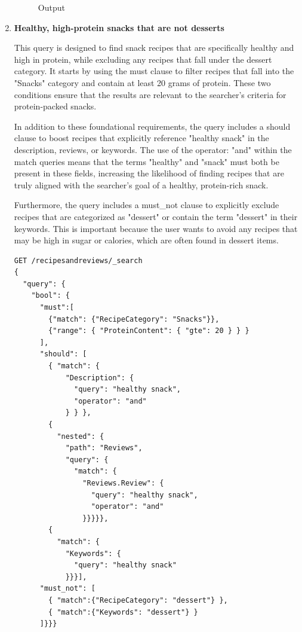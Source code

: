 \begin{enumerate}
\begin{figure}[h!]
    \caption{Output}
    \end{figure}
    
    \clearpage
    
    \item \textbf{Healthy, high-protein snacks that are not desserts}

    This query is designed to find snack recipes that are specifically healthy and high in protein, while excluding any recipes that fall under the dessert category. It starts by using the must clause to filter recipes that fall into the "Snacks" category and contain at least 20 grams of protein. These two conditions ensure that the results are relevant to the searcher's criteria for protein-packed snacks.

    In addition to these foundational requirements, the query includes a should clause to boost recipes that explicitly reference "healthy snack" in the description, reviews, or keywords. The use of the operator: "and" within the match queries means that the terms "healthy" and "snack" must both be present in these fields, increasing the likelihood of finding recipes that are truly aligned with the searcher's goal of a healthy, protein-rich snack.

    Furthermore, the query includes a must\_not clause to explicitly exclude recipes that are categorized as "dessert" or contain the term "dessert" in their keywords. This is important because the user wants to avoid any recipes that may be high in sugar or calories, which are often found in dessert items.

    \begin{verbatim}
GET /recipesandreviews/_search
{
  "query": {
    "bool": {
      "must":[
        {"match": {"RecipeCategory": "Snacks"}},
        {"range": { "ProteinContent": { "gte": 20 } } }
      ],
      "should": [
        { "match": { 
            "Description": {
              "query": "healthy snack",
              "operator": "and"
            } } },
        {
          "nested": {
            "path": "Reviews",
            "query": {
              "match": {
                "Reviews.Review": {
                  "query": "healthy snack",
                  "operator": "and"
                }}}}},
        {
          "match": {
            "Keywords": {
              "query": "healthy snack"
            }}}],
      "must_not": [
        { "match":{"RecipeCategory": "dessert"} },
        { "match":{"Keywords": "dessert"} }
      ]}}}
    \end{verbatim}


\end{enumerate}
